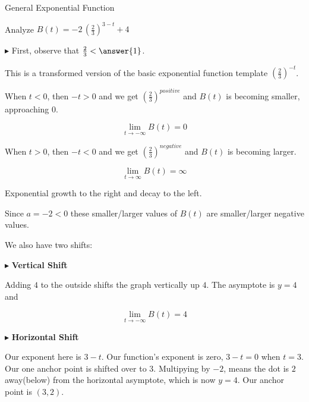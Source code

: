 \documentclass{ximera}
\begin{document}
\begin{example}  General Exponential Function



Analyze   $B(t) = -2 \, \left( \frac{2}{3} \right)^{3-t} + 4$ \\


\begin{explanation}



$\blacktriangleright$  First, observe that $\frac{2}{3} < \answer{1}$.

\begin{model}

This is a transformed version of the basic exponential function template $\left( \frac{2}{3} \right)^{-t}$.  



When $t < 0$, then $-t > 0$ and we get  $\left( \frac{2}{3} \right)^{positive}$ and $B(t)$ is becoming smaller, approaching $0$.  





\[ \lim\limits_{t \to -\infty} B(t) = 0 \]



When $t > 0$, then $-t < 0$ and we get  $\left( \frac{2}{3} \right)^{negative}$ and $B(t)$ is becoming larger.  



\[ \lim\limits_{t \to \infty} B(t) = \infty \]




Exponential growth to the right and decay to the left.



\end{model}


Since $a = -2 < 0$ these smaller/larger values of $B(t)$ are smaller/larger negative values.



We also have two shifts:




$\blacktriangleright$ \textbf{Vertical Shift}


Adding $4$ to the outside shifts the graph vertically up $4$.  The asymptote is $y = 4$ and 

\[ \lim\limits_{t \to -\infty} B(t) = 4 \]



$\blacktriangleright$ \textbf{Horizontal Shift}

Our exponent here is $3 - t$.  Our function's exponent is zero, $3-t=0$ when $t=3$. Our one anchor point is shifted over to $3$.  Multipying by $-2$, means the dot is $2$ away(below) from the horizontal asymptote, which is now $y=4$.  Our anchor point is $(3, 2)$.









\end{explanation}
\end{example}
\end{document}
